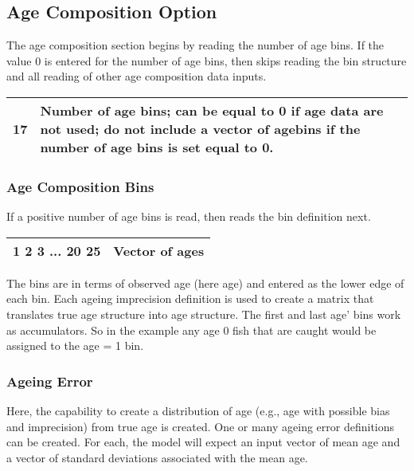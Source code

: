 \subsection{Age Composition Option}
The age composition section begins by reading the number of age bins.  If the value 0 is entered for the number of age bins, then skips reading the bin structure and all reading of other age composition data inputs.
\begin{center}
	\begin{tabular}{p{2cm} p{13cm}  }
		\hline
		17 \Tstrut & Number of age bins; can be equal to 0 if age data are not used; do not include a vector of agebins if the number of age bins is set equal to 0.\Bstrut\\
		\hline
	\end{tabular}
\end{center}


\subsubsection{Age Composition Bins}
If a positive number of age bins is read, then reads the bin definition next.
\begin{center}
	\begin{tabular}{p{3cm} p{12cm}  }
		\hline
		1 2 3 ... 20 25 & Vector of ages\Tstrut\Bstrut\\
		\hline		
	\end{tabular}
\end{center}
The bins are in terms of observed age (here age) and entered as the lower edge of each bin. Each ageing imprecision definition is used to create a matrix that translates true age structure into age structure. The first and last age' bins work as accumulators.  So in the example any age 0 fish that are caught would be assigned to the age = 1 bin.

\subsubsection{Ageing Error}
Here, the capability to create a distribution of age (e.g., age with possible bias and imprecision) from true age is created. One or many ageing error definitions can be created. For each, the model will expect an input vector of mean age and a vector of standard deviations associated with the mean age. 

